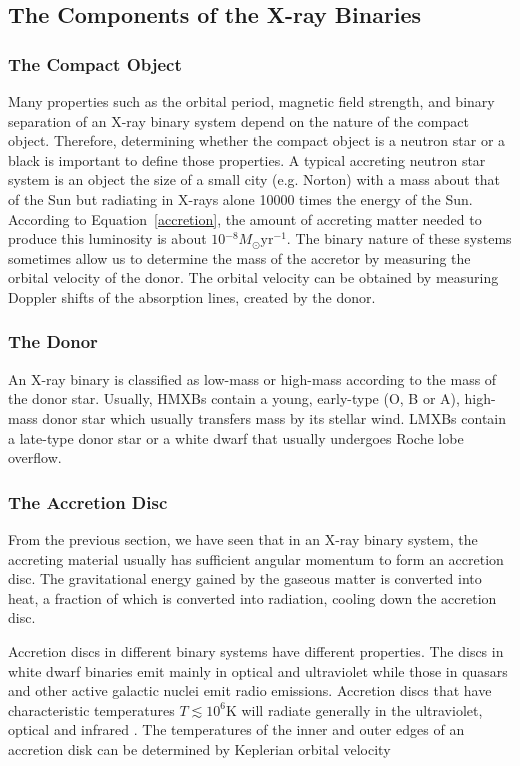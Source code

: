 \subsection{The Components of the X-ray Binaries}
\subsubsection{The Compact Object}
Many properties such as the orbital period, magnetic field strength, and binary separation of an X-ray binary system depend on the nature of the compact object. Therefore, determining whether the compact object is a neutron star or a black is important to define those properties. A typical accreting neutron star system is an object the size of a small city (e.g. Norton) with a mass about that of the Sun but radiating in X-rays alone 10000 times the energy of the Sun. According to Equation~\ref{accretion}, the amount of accreting matter needed to produce this luminosity is about $10{^{-8}} M_{\odot}\mathrm{yr}^{-1}$. The binary nature of these systems sometimes allow us to determine the mass of the accretor by measuring the orbital velocity of the donor. The orbital velocity can be obtained by measuring Doppler shifts of the absorption lines, created by the donor.  \par

\subsubsection{The Donor}
An X-ray binary is classified as low-mass or high-mass according to the mass of the donor star. Usually, HMXBs contain a young, early-type (O, B or A), high-mass donor star which usually transfers mass by its stellar wind. LMXBs contain a late-type donor star or a white dwarf that usually undergoes Roche lobe overflow. 


\subsubsection{The Accretion Disc}
From the previous section, we have seen that in an X-ray binary system, the accreting material usually has sufficient angular momentum to form an accretion disc. The gravitational energy gained by the gaseous matter is converted into heat, a fraction of which is converted into radiation, cooling down the accretion disc.\par 
Accretion discs in different binary systems have different properties. The discs in white dwarf binaries emit mainly in optical and ultraviolet while those in quasars and other active galactic nuclei emit radio emissions. Accretion discs that have characteristic temperatures $T\lesssim 10^6$K will radiate generally in the ultraviolet, optical and infrared \citep{King2002}. The temperatures of the inner and outer edges of an accretion disk can be determined by Keplerian orbital velocity

